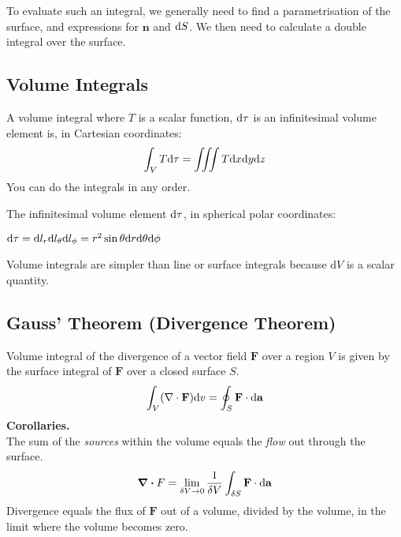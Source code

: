 To evaluate such an integral, we generally need to find a parametrisation of the surface, and expressions for $\mathbf{n}$ and $\differential S$. We
then need to calculate a double integral over the surface.

\subsection*{Volume Integrals}
A volume integral where $T$ is a scalar function, $\differential \tau$ is an infinitesimal volume element is, in Cartesian coordinates:
\begin{equation*}
    \int_{V} T \differential \tau = \iiint T \differential x \differential y \differential z
\end{equation*}
You can do the integrals in any order. 

The infinitesimal volume element $\differential \tau$, in spherical polar coordinates:

$\differential \tau = \differential l_r \differential l_\theta \differential l_\phi = r^2 \sin \theta \differential r \differential \theta \differential \phi$

Volume integrals are simpler than line or surface integrals because $\mathrm{d}V$ is a scalar quantity.

\subsection*{Gauss' Theorem (Divergence Theorem)}
Volume integral of the divergence of a vector field $\mathbf{F}$ over a region $V$ is given by the surface integral of $\mathbf{F}$ over a closed surface $S$.
\begin{equation*}
    \int_V (\nabla \cdot \mathbf{F}) \differential v = \oint_S \mathbf{F} \cdot \differential \mathbf{a}
\end{equation*}
\textbf{Corollaries.} \\
The sum of the \textit{sources} within the volume equals the \textit{flow} out through the surface.
\begin{equation*}
    \div F = \lim_{\delta V \rightarrow 0} \frac{1}{\delta V} \int_{\delta S} \mathbf{F} \cdot \differential \mathbf{a}
\end{equation*}
Divergence equals the flux of $\mathbf{F}$ out of a volume, divided by the volume, in the limit where the volume becomes zero.

